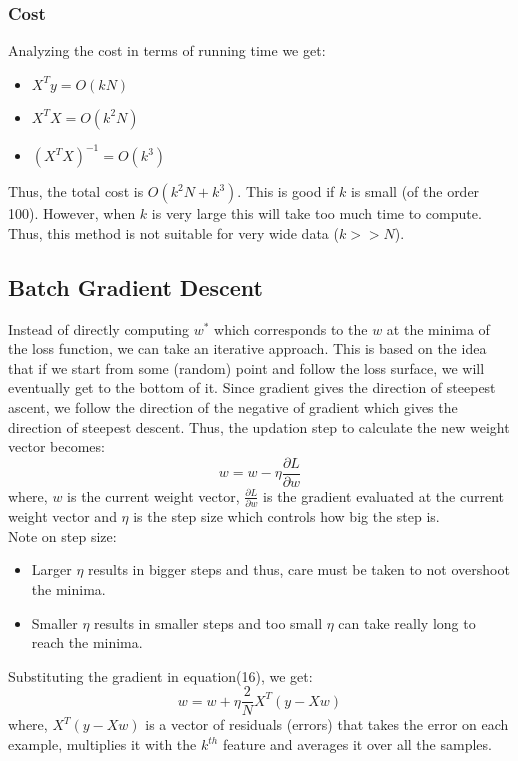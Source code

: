 \subsubsection{Cost}
Analyzing the cost in terms of running time we get: 
\begin{itemize}
\item $X^{T}y=O(kN)$
\item $X^{T}X=O(k^{2}N)$
\item $(X^{T}X)^{-1}=O(k^{3})$
\end{itemize}
Thus, the total cost is $O(k^{2}N+k^{3})$. This is good if $k$ is small (of the order 100). However, when $k$ is very large this will take too much time to compute. Thus, this method is not suitable for very wide data ($k>>N$). 
\subsection{Batch Gradient Descent}
Instead of directly computing $w^{*}$ which corresponds to the $w$ at the minima of the loss function, we can take an iterative approach. This is based on the idea that if we start from some (random) point and follow the loss surface, we will eventually get to the bottom of it. Since gradient gives the direction of steepest ascent, we follow the direction of the negative of gradient which gives the direction of steepest descent. Thus, the updation step to calculate the new weight vector becomes:
\begin{equation}
w=w-\eta \frac{\partial L}{\partial w}
\end{equation} 
where, $w$ is the current weight vector, $\frac{\partial L}{\partial w}$ is the gradient evaluated at the current weight vector and $\eta$ is the step size which controls how big the step is.  
\\ Note on step size:
\begin{itemize}
\item Larger $\eta$ results in bigger steps and thus, care must be taken to not overshoot the minima.  
\item Smaller  $\eta$ results in smaller steps and too small $\eta$ can take really long to reach the minima. 
\end{itemize}
Substituting the gradient in equation(16), we get: 
\begin{equation}
w=w+\eta \frac{2}{N} X^{T}(y-Xw)
\end{equation}
where, $X^{T}(y-Xw)$ is a vector of residuals (errors) that takes the error on each example, multiplies it with the $k^{th}$ feature and averages it over all the samples.   
